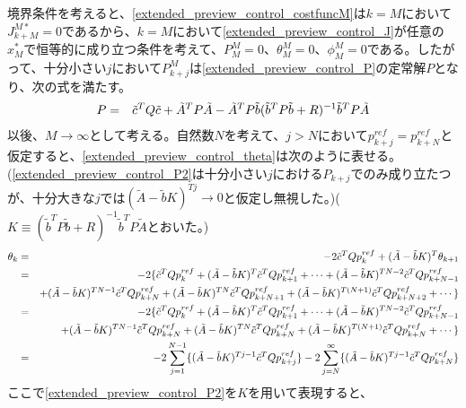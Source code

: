 境界条件を考えると、\eqref{extended_preview_control_costfuncM}は$k = M$において$J_{k+M}^{M\ast} = 0$であるから、$k = M$において\eqref{extended_preview_control_J}が任意の$x_{M}^\ast$で恒等的に成り立つ条件を考えて、$P_{M}^M = 0$、$\theta_{M}^M = 0$、$\phi_{M}^M = 0$である。したがって、十分小さい$j$において$P_{k+j}^M$は\eqref{extended_preview_control_P}の定常解$P$となり、次の式を満たす。
\begin{eqnarray}
  P &=& \tilde{c}^T Q \tilde{c} + \tilde{A}^T P \tilde{A} - \tilde{A}^T P \tilde{b} (\tilde{b}^T P \tilde{b} + R )^{-1} \tilde{b}^T P \tilde{A} \eqlabel{extended_preview_control_P2}
\end{eqnarray}
以後、$M \rightarrow \infty$として考える。自然数$N$を考えて、$j > N$において$p_{k+j}^{ref} = p_{k+N}^{ref}$と仮定すると、\eqref{extended_preview_control_theta}は次のように表せる。(\eqref{extended_preview_control_P2}は十分小さい$j$における$P_{k+j}$でのみ成り立たつが、十分大きな$j$では$(\tilde{A} - \tilde{b} K)^{T j} \rightarrow 0$と仮定し無視した。)($K \equiv (\tilde{b}^T P \tilde{b} + R )^{-1} \tilde{b}^T P \tilde{A}$とおいた。)
\begin{eqnarray}
  \theta_k &=& -2 \tilde{c}^T Q p_k^{ref} + (\tilde{A} - \tilde{b} K)^T \theta_{k+1} \nonumber\\
  &=& -2 \{ \tilde{c}^T Q p_k^{ref} + (\tilde{A} - \tilde{b} K)^T \tilde{c}^T Q p_{k+1}^{ref} + \cdots + (\tilde{A} - \tilde{b} K)^{T N-2} \tilde{c}^T Q p_{k+N-1}^{ref} \nonumber\\
  & & + (\tilde{A} - \tilde{b} K)^{T N-1} \tilde{c}^T Q p_{k+N}^{ref} + (\tilde{A} - \tilde{b} K)^{T N} \tilde{c}^T Q p_{k+N+1}^{ref} + (\tilde{A} - \tilde{b} K)^{T (N+1)} \tilde{c}^T Q p_{k+N+2}^{ref} + \cdots \} \nonumber \\
  &=& -2 \{ \tilde{c}^T Q p_k^{ref} + (\tilde{A} - \tilde{b} K)^T \tilde{c}^T Q p_{k+1}^{ref} + \cdots + (\tilde{A} - \tilde{b} K)^{T N-2} \tilde{c}^T Q p_{k+N-1}^{ref} \nonumber\\
  & & + (\tilde{A} - \tilde{b} K)^{T N-1} \tilde{c}^T Q p_{k+N}^{ref} + (\tilde{A} - \tilde{b} K)^{T N} \tilde{c}^T Q p_{k+N}^{ref} + (\tilde{A} - \tilde{b} K)^{T (N+1)} \tilde{c}^T Q p_{k+N}^{ref} + \cdots \} \nonumber \\
  &=& -2 \sum_{j=1}^{N-1} \{ (\tilde{A} - \tilde{b} K)^{T j-1} \tilde{c}^T Q p_{k+j}^{ref} \} -2 \sum_{j=N}^{\infty} \{ (\tilde{A} - \tilde{b} K)^{T j-1} \tilde{c}^T Q p_{k+N}^{ref} \}\eqlabel{extended_preview_control_theta2}
\end{eqnarray}
ここで\eqref{extended_preview_control_P2}を$K$を用いて表現すると、

